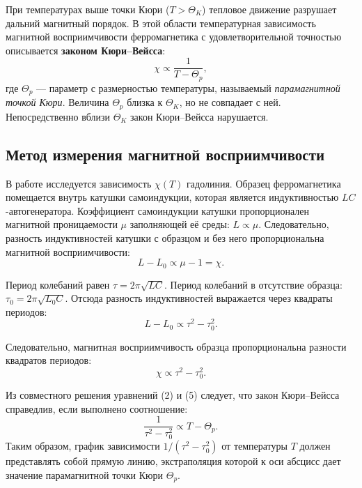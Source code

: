 \documentclass[a4paper,10pt]{article}
\begin{document}
При температурах выше точки Кюри (\(T > \Theta_K\)) тепловое движение разрушает дальний магнитный порядок. В этой области температурная зависимость магнитной восприимчивости ферромагнетика с удовлетворительной точностью описывается \textbf{законом Кюри--Вейсса}:
\begin{equation}
    \chi \propto \frac{1}{T - \Theta_p},
\end{equation}
где \(\Theta_p\) — параметр с размерностью температуры, называемый \textit{парамагнитной точкой Кюри}. Величина \(\Theta_p\) близка к \(\Theta_K\), но не совпадает с ней. Непосредственно вблизи \(\Theta_K\) закон Кюри--Вейсса нарушается.

\subsection*{Метод измерения магнитной восприимчивости}

В работе исследуется зависимость \(\chi(T)\) гадолиния. Образец ферромагнетика помещается внутрь катушки самоиндукции, которая является индуктивностью \(LC\)-автогенератора. Коэффициент самоиндукции катушки пропорционален магнитной проницаемости \(\mu\) заполняющей её среды: \(L \propto \mu\). Следовательно, разность индуктивностей катушки с образцом и без него пропорциональна магнитной восприимчивости:
\begin{equation}
    L - L_0 \propto \mu - 1 = \chi.
\end{equation}

Период колебаний равен \(\tau = 2\pi\sqrt{LC}\). Период колебаний в отсутствие образца: \(\tau_0 = 2\pi\sqrt{L_0 C}\). Отсюда разность индуктивностей выражается через квадраты периодов:
\begin{equation}
    L - L_0 \propto \tau^2 - \tau_0^2.
\end{equation}

Следовательно, магнитная восприимчивость образца пропорциональна разности квадратов периодов:
\begin{equation}
    \chi \propto \tau^2 - \tau_0^2.
\end{equation}

Из совместного решения уравнений (2) и (5) следует, что закон Кюри--Вейсса справедлив, если выполнено соотношение:
\begin{equation}
    \frac{1}{\tau^2 - \tau_0^2} \propto T - \Theta_p.
\end{equation}
Таким образом, график зависимости \(1/(\tau^2 - \tau_0^2)\) от температуры \(T\) должен представлять собой прямую линию, экстраполяция которой к оси абсцисс дает значение парамагнитной точки Кюри \(\Theta_p\).
\end{document}
